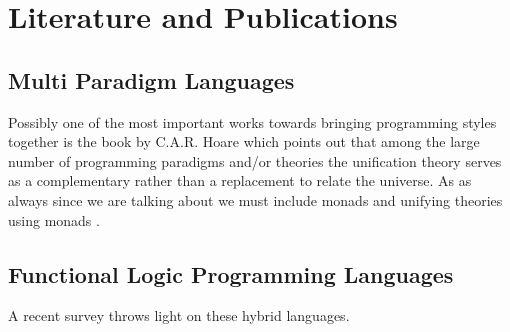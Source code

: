\documentclass[thesis-solanki.tex]{subfiles}
\begin{document}
\begin{comment}
As a matter of fact the holy grail of information is maintained by two of the most important people in the field
Michael Hanus \cite{website:mhanus} and Sergio Antoy \cite{website:santoy}.
\end{comment}




\section{Literature and Publications}
\subsection{Multi Paradigm Languages}
Possibly one of the most important works towards bringing programming styles together is the book by C.A.R.
Hoare \cite{hoare1998unifying} which points out that among the large number of programming paradigms and/or
theories the unification theory serves as a complementary rather than a replacement to relate the universe.
As as always since we are talking about  we must include monads and unifying theories using
monads \cite{gibbons2013unifying}.
 

\subsection{Functional Logic Programming Languages}

A recent survey \cite{hanus2007multi} throws light on these hybrid languages. 
\end{document}

